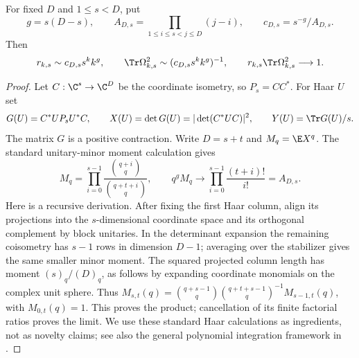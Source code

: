 \begin{theorem}\label{thm:flat-average}
For fixed $D$ and $1\le s<D$, put
\begin{equation}\label{eq:rank-constant}
 g=s(D-s),\qquad A_{D,s}=\prod_{1\le i\le s<j\le D}(j-i),\qquad
 c_{D,s}=s^{-g}/A_{D,s}.
\end{equation}
Then
\begin{equation}\label{eq:support-asymptotic}
 r_{k,s}\sim c_{D,s}s^kk^g,\qquad
 \Tr\Omega_{k,s}^2\sim(c_{D,s}s^kk^g)^{-1},\qquad
 r_{k,s}\Tr\Omega_{k,s}^2\longrightarrow1.
\end{equation}
\end{theorem}
\begin{proof}
Let $C:\C^s\to\C^D$ be the coordinate isometry, so $P_s=CC^*$. For Haar $U$ set
\[
 G(U)=C^*UP_sU^*C,\qquad X(U)=\det G(U)=|\det(C^*UC)|^2,
 \qquad Y(U)=\Tr G(U)/s.
\]
The matrix $G$ is a positive contraction. Write $D=s+t$ and $M_q=\E X^q$. The standard unitary-minor moment calculation gives
\begin{equation}\label{eq:minor-moment}
 M_q=\prod_{i=0}^{s-1}\frac{\binom{q+i}{q}}{\binom{q+t+i}{q}},
 \qquad q^gM_q\longrightarrow
 \prod_{i=0}^{s-1}\frac{(t+i)!}{i!}=A_{D,s}.
\end{equation}
Here is a recursive derivation. After fixing the first Haar column, align its projections into the $s$-dimensional coordinate space and its orthogonal complement by block unitaries. In the determinant expansion the remaining coisometry has $s-1$ rows in dimension $D-1$; averaging over the stabilizer gives the same smaller minor moment. The squared projected column length has moment $(s)_q/(D)_q$, as follows by expanding coordinate monomials on the complex unit sphere. Thus $M_{s,t}(q)=\binom{q+s-1}{q}\binom{q+t+s-1}{q}^{-1}M_{s-1,t}(q)$, with $M_{0,t}(q)=1$. This proves the product; cancellation of its finite factorial ratios proves the limit. We use these standard Haar calculations as ingredients, not as novelty claims; see also the general polynomial integration framework in \cite{collins-sniady}.


\end{proof}
